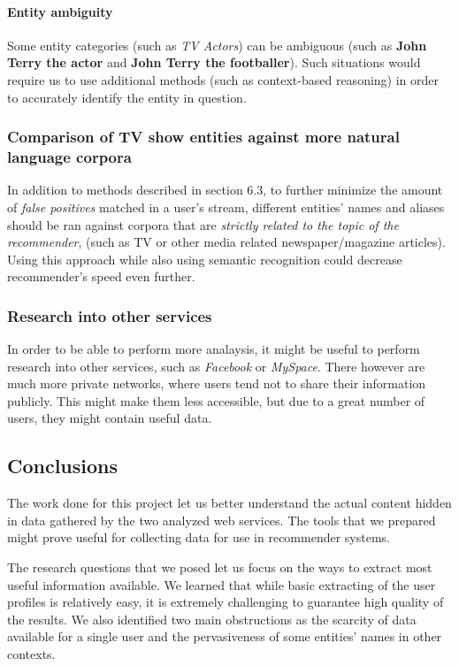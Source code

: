 \paragraph{Entity ambiguity}

Some entity categories (such as \textit{TV Actors}) can be ambiguous (such as \textbf{John Terry the actor} and \textbf{John Terry the footballer}). Such situations
would require us to use additional methods (such as context-based reasoning) in order to accurately identify the entity in question.

\subsubsection{Comparison of TV show entities against more natural language corpora}

In addition to methods described in section 6.3, to further minimize the amount of \textit{false positives}
matched in a user's stream, different entities' names and aliases should be ran against corpora
that are \textit{strictly related to the topic of the recommender}, (such as TV or other media related
newspaper/magazine articles). Using this approach while also using semantic
recognition could decrease recommender's speed even further.

\subsubsection{Research into other services}

In order to be able to perform more analaysis, it might be useful to perform
research into other services, such as \textit{Facebook} or \textit{MySpace}.
There however are much more private networks, where users tend not to share
their information publicly. This might make them less accessible, but due to a
great number of users, they might contain useful data.

\subsection{Conclusions}

The work done for this project let us better understand the actual content
hidden in data gathered by the two analyzed web services. The tools that we
prepared might prove useful for collecting data for use in recommender systems.

The research questions that we posed let us focus on the ways to extract most
useful information available. We learned that while basic extracting of the
user profiles is relatively easy, it is extremely challenging to guarantee high
quality of the results. We also identified two main obstructions as the
scarcity of data available for a single user and the pervasiveness of some
entities' names in other contexts.
